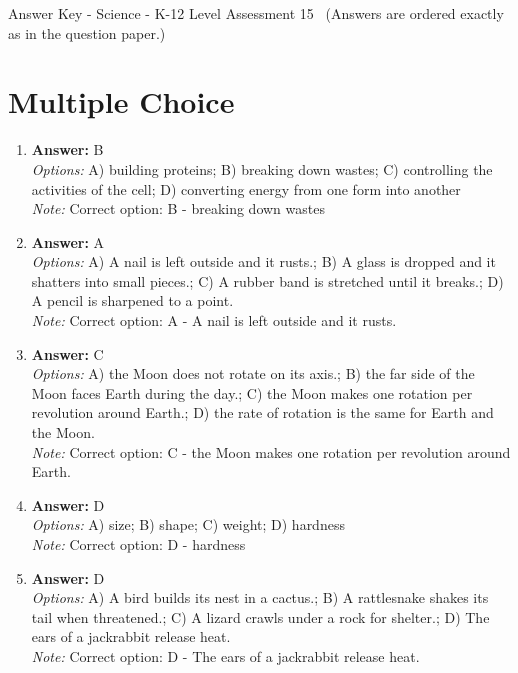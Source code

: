 \documentclass[12pt]{article}
\begin{document}
\begin{center}
Answer Key - Science - K-12 Level Assessment 15 \
\small (Answers are ordered exactly as in the question paper.)
\end{center}

\section*{Multiple Choice}
\begin{enumerate}[label=\arabic*.]
\item \textbf{Answer:} B
\\ \textit{Options:} A) building proteins; B) breaking down wastes; C) controlling the activities of the cell; D) converting energy from one form into another
\\ \textit{Note:} Correct option: B - breaking down wastes
\item \textbf{Answer:} A
\\ \textit{Options:} A) A nail is left outside and it rusts.; B) A glass is dropped and it shatters into small pieces.; C) A rubber band is stretched until it breaks.; D) A pencil is sharpened to a point.
\\ \textit{Note:} Correct option: A - A nail is left outside and it rusts.
\item \textbf{Answer:} C
\\ \textit{Options:} A) the Moon does not rotate on its axis.; B) the far side of the Moon faces Earth during the day.; C) the Moon makes one rotation per revolution around Earth.; D) the rate of rotation is the same for Earth and the Moon.
\\ \textit{Note:} Correct option: C - the Moon makes one rotation per revolution around Earth.
\item \textbf{Answer:} D
\\ \textit{Options:} A) size; B) shape; C) weight; D) hardness
\\ \textit{Note:} Correct option: D - hardness
\item \textbf{Answer:} D
\\ \textit{Options:} A) A bird builds its nest in a cactus.; B) A rattlesnake shakes its tail when threatened.; C) A lizard crawls under a rock for shelter.; D) The ears of a jackrabbit release heat.
\\ \textit{Note:} Correct option: D - The ears of a jackrabbit release heat.
\end{enumerate}
\end{document}
